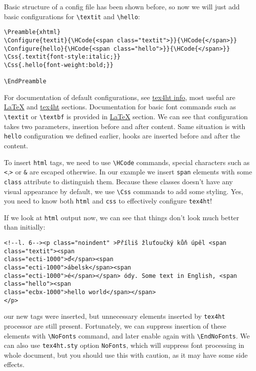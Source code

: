 Basic structure of a config file has been shown before, so now we will
just add basic configurations for \texttt{\textbackslash{}textit} and
\texttt{\textbackslash{}hello}:

\begin{verbatim}
\Preamble{xhtml}
\Configure{textit}{\HCode{<span class="textit">}}{\HCode{</span>}}
\Configure{hello}{\HCode{<span class="hello">}}{\HCode{</span>}}
\Css{.textit{font-style:italic;}}
\Css{.hello{font-weight:bold;}}

\EndPreamble
\end{verbatim}

For documentation of default configurations, see
\href{http://michal-h21.github.io/src4ht/tex4ht-info.html}{tex4ht info},
most useful are
\href{http://michal-h21.github.io/src4ht/tex4ht-infose2.html}{LaTeX} and
\href{http://michal-h21.github.io/src4ht/tex4ht-infose1.html}{tex4ht}
sections. Documentation for basic font commands such as
\texttt{\textbackslash{}textit} or \texttt{\textbackslash{}textbf} is
provided in
\href{http://michal-h21.github.io/src4ht/tex4ht-infose2.html}{LaTeX}
section. We can see that configuration takes two parameters, insertion
before and after content. Same situation is with \texttt{hello}
configuration we defined earlier, hooks are inserted before and after
the content.

To insert \texttt{html} tags, we need to use
\texttt{\textbackslash{}HCode} commands, special characters such as
\texttt{\textless{}},\texttt{\textgreater{}} or \texttt{\&} are escaped
otherwise. In our example we insert \texttt{span} elements with some
\texttt{class} attribute to distinguish them. Because these classes
doesn't have any visual appearance by default, we use
\texttt{\textbackslash{}Css} commands to add some styling. Yes, you need
to know both \texttt{html} and \texttt{css} to effectively configure
\texttt{tex4ht}!

If we look at \texttt{html} output now, we can see that things don't
look much better than initially:

\begin{verbatim}
<!--l. 6--><p class="noindent" >Příliš žluťoučký kůň úpěl <span class="textit"><span 
class="ecti-1000">ď</span><span 
class="ecti-1000">ábelsk</span><span 
class="ecti-1000">é</span></span> ódy. Some text in English, <span class="hello"><span 
class="ecbx-1000">hello world</span></span>
</p> 
\end{verbatim}

our new tags were inserted, but unnecessary elements inserted by
\texttt{tex4ht} processor are still present. Fortunately, we can
suppress insertion of these elements with
\texttt{\textbackslash{}NoFonts} command, and later enable again with
\texttt{\textbackslash{}EndNoFonts}. We can also use \texttt{tex4ht.sty}
option \texttt{NoFonts}, which will suppress font processing in whole
document, but you should use this with caution, as it may have some side
effects.

